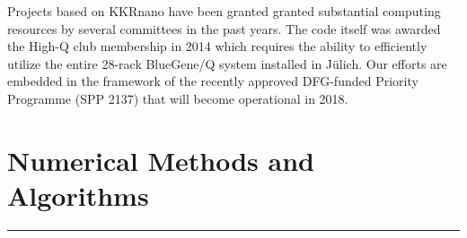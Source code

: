 \documentclass [a4paper, 12pt]{article}
\begin{document}
Projects based on KKRnano have been granted
granted substantial computing resources by several committees in the past years.
The code itself was awarded the High-Q club membership in 2014 which requires the ability to
efficiently utilize the entire 28-rack BlueGene/Q system installed in J\"ulich.
Our efforts are embedded in the framework of the recently approved DFG-funded
Priority Programme (SPP 2137)
that will become operational in 2018. 




\section{Numerical Methods and Algorithms} 
\rule{\textwidth}{0.4pt}\\
 
\end{document}
